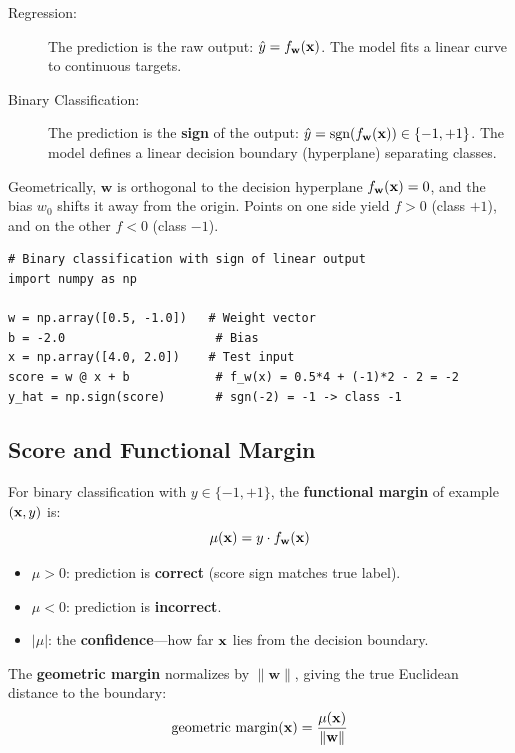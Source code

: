\begin{description}
    \item[Regression:] The prediction is the raw output: $\hat{y} = f_{\mathbf{w}}(\mathbf{x})$. The model fits a linear curve to continuous targets.
    \item[Binary Classification:] The prediction is the \textbf{sign} of the output: $\hat{y} = \text{sgn}(f_{\mathbf{w}}(\mathbf{x})) \in \{-1, +1\}$. The model defines a linear decision boundary (hyperplane) separating classes.
\end{description}

Geometrically, $\mathbf{w}$ is orthogonal to the decision hyperplane $f_{\mathbf{w}}(\mathbf{x}) = 0$, and the bias $w_0$ shifts it away from the origin. Points on one side yield $f > 0$ (class $+1$), and on the other $f < 0$ (class $-1$).

\begin{lstlisting}[style=pythonstyle]
# Binary classification with sign of linear output
import numpy as np

w = np.array([0.5, -1.0])   # Weight vector
b = -2.0                     # Bias
x = np.array([4.0, 2.0])    # Test input
score = w @ x + b            # f_w(x) = 0.5*4 + (-1)*2 - 2 = -2
y_hat = np.sign(score)       # sgn(-2) = -1 -> class -1
\end{lstlisting}

\subsection*{Score and Functional Margin}

\begin{definition}
For binary classification with $y \in \{-1, +1\}$, the \textbf{functional margin} of example $(\mathbf{x}, y)$ is:
$$\mu(\mathbf{x}) = y \cdot f_{\mathbf{w}}(\mathbf{x})$$
\begin{itemize}
    \item $\mu > 0$: prediction is \textbf{correct} (score sign matches true label).
    \item $\mu < 0$: prediction is \textbf{incorrect}.
    \item $|\mu|$: the \textbf{confidence}---how far $\mathbf{x}$ lies from the decision boundary.
\end{itemize}
The \textbf{geometric margin} normalizes by $\|\mathbf{w}\|$, giving the true Euclidean distance to the boundary:
$$\text{geometric margin}(\mathbf{x}) = \frac{\mu(\mathbf{x})}{\|\mathbf{w}\|}$$
\end{definition}


